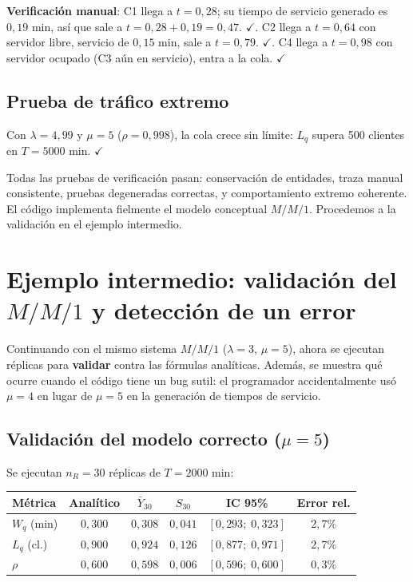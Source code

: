 \documentclass[11pt, letterpaper]{article}
\begin{document}
\textbf{Verificación manual}: C1 llega a $t=0{,}28$; su tiempo de servicio generado es $0{,}19$ min, así que sale a $t=0{,}28+0{,}19=0{,}47$. $\checkmark$. C2 llega a $t=0{,}64$ con servidor libre, servicio de $0{,}15$ min, sale a $t=0{,}79$. $\checkmark$. C4 llega a $t=0{,}98$ con servidor ocupado (C3 aún en servicio), entra a la cola. $\checkmark$

\subsection{Prueba de tráfico extremo}

Con $\lambda=4{,}99$ y $\mu=5$ ($\rho=0{,}998$), la cola crece sin límite: $L_q$ supera 500 clientes en $T=5000$ min. $\checkmark$

\begin{resultadobox}
Todas las pruebas de verificación pasan: conservación de entidades, traza manual consistente, pruebas degeneradas correctas, y comportamiento extremo coherente. El código implementa fielmente el modelo conceptual $M/M/1$. Procedemos a la validación en el ejemplo intermedio.
\end{resultadobox}

\section{Ejemplo intermedio: validación del $M/M/1$ y detección de un error}

\begin{ejemplobox}[Sistema]
Continuando con el mismo sistema $M/M/1$ ($\lambda=3$, $\mu=5$), ahora se ejecutan réplicas para \textbf{validar} contra las fórmulas analíticas. Además, se muestra qué ocurre cuando el código tiene un bug sutil: el programador accidentalmente usó $\mu=4$ en lugar de $\mu=5$ en la generación de tiempos de servicio.
\end{ejemplobox}

\subsection{Validación del modelo correcto ($\mu=5$)}

Se ejecutan $n_R=30$ réplicas de $T=2000$ min:

\begin{center}\small
\renewcommand{\arraystretch}{1.3}
\begin{tabular}{lccccc}
\toprule
\textbf{Métrica} & \textbf{Analítico} & $\bar Y_{30}$ & $S_{30}$ & \textbf{IC 95\%} & \textbf{Error rel.} \\
\midrule
$W_q$ (min) & $0{,}300$ & $0{,}308$ & $0{,}041$ & $[0{,}293;\; 0{,}323]$ & $2{,}7\%$ \\
$L_q$ (cl.)  & $0{,}900$ & $0{,}924$ & $0{,}126$ & $[0{,}877;\; 0{,}971]$ & $2{,}7\%$ \\
$\rho$       & $0{,}600$ & $0{,}598$ & $0{,}006$ & $[0{,}596;\; 0{,}600]$ & $0{,}3\%$ \\
\bottomrule
\end{tabular}
\end{center}
\end{document}
